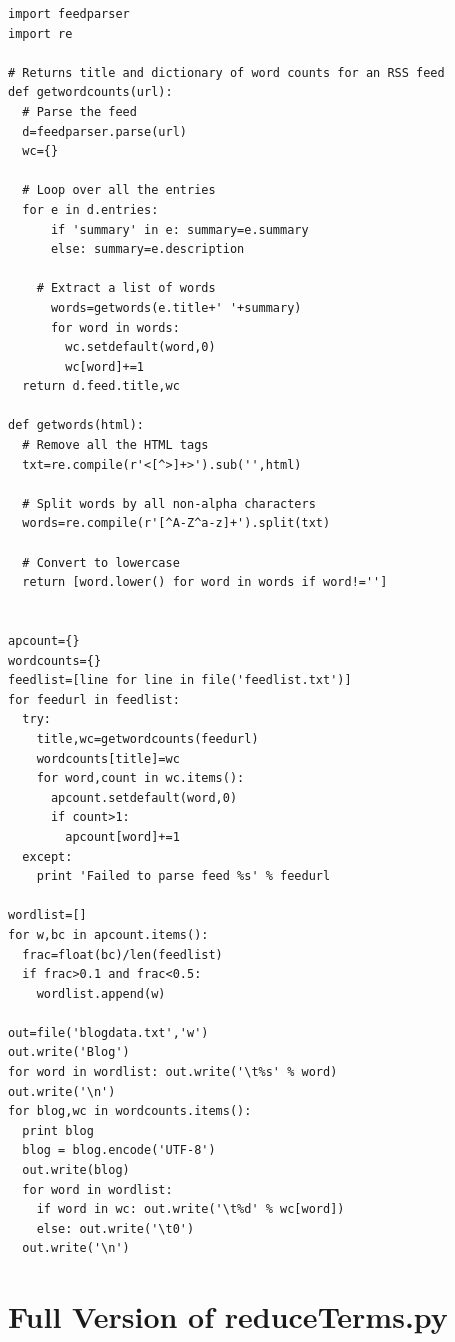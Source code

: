 \documentclass{article}
\begin{document}
\begin{lstlisting}[frame=single, caption=generatefeedvector.py, label=generatefeedvector]
import feedparser
import re

# Returns title and dictionary of word counts for an RSS feed
def getwordcounts(url):
  # Parse the feed
  d=feedparser.parse(url)
  wc={}

  # Loop over all the entries
  for e in d.entries:
      if 'summary' in e: summary=e.summary
      else: summary=e.description

    # Extract a list of words
      words=getwords(e.title+' '+summary)
      for word in words:
        wc.setdefault(word,0)
        wc[word]+=1
  return d.feed.title,wc

def getwords(html):
  # Remove all the HTML tags
  txt=re.compile(r'<[^>]+>').sub('',html)

  # Split words by all non-alpha characters
  words=re.compile(r'[^A-Z^a-z]+').split(txt)

  # Convert to lowercase
  return [word.lower() for word in words if word!='']


apcount={}
wordcounts={}
feedlist=[line for line in file('feedlist.txt')]
for feedurl in feedlist:
  try:
    title,wc=getwordcounts(feedurl)
    wordcounts[title]=wc
    for word,count in wc.items():
      apcount.setdefault(word,0)
      if count>1:
        apcount[word]+=1
  except:
    print 'Failed to parse feed %s' % feedurl

wordlist=[]
for w,bc in apcount.items():
  frac=float(bc)/len(feedlist)
  if frac>0.1 and frac<0.5:
    wordlist.append(w)

out=file('blogdata.txt','w')
out.write('Blog')
for word in wordlist: out.write('\t%s' % word)
out.write('\n')
for blog,wc in wordcounts.items():
  print blog
  blog = blog.encode('UTF-8')
  out.write(blog)
  for word in wordlist:
    if word in wc: out.write('\t%d' % wc[word])
    else: out.write('\t0')
  out.write('\n')
\end{lstlisting}

\section{Full Version of reduceTerms.py}
\end{document}
